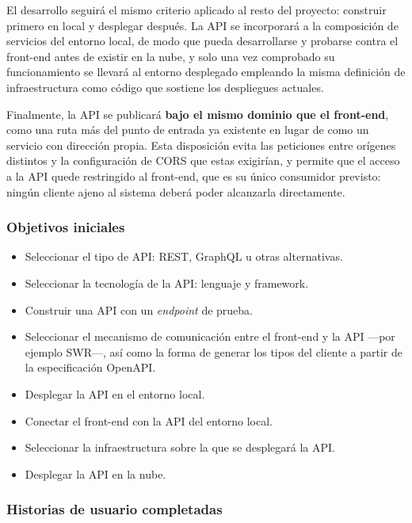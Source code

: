 El desarrollo seguirá el mismo criterio aplicado al resto del proyecto:
construir primero en local y desplegar después. La API se incorporará a la
composición de servicios del entorno local, de modo que pueda desarrollarse y
probarse contra el front-end antes de existir en la nube, y solo una vez
comprobado su funcionamiento se llevará al entorno desplegado empleando la
misma definición de infraestructura como código que sostiene los despliegues
actuales.

Finalmente, la API se publicará \textbf{bajo el mismo dominio que el
	front-end}, como una ruta más del punto de entrada ya existente en lugar de
como un servicio con dirección propia. Esta disposición evita las peticiones
entre orígenes distintos y la configuración de CORS que estas exigirían, y
permite que el acceso a la API quede restringido al front-end, que es su único
consumidor previsto: ningún cliente ajeno al sistema deberá poder alcanzarla
directamente.

\subsubsection*{Objetivos iniciales}

\begin{itemize}
	\item Seleccionar el tipo de API: REST, GraphQL u otras alternativas.
	\item Seleccionar la tecnología de la API: lenguaje y framework.
	\item Construir una API con un \textit{endpoint} de prueba.
	\item Seleccionar el mecanismo de comunicación entre el front-end y la API
	      —por ejemplo SWR—, así como la forma de generar los tipos del cliente a
	      partir de la especificación OpenAPI.
	\item Desplegar la API en el entorno local.
	\item Conectar el front-end con la API del entorno local.
	\item Seleccionar la infraestructura sobre la que se desplegará la API.
	\item Desplegar la API en la nube.
\end{itemize}

\subsubsection*{Historias de usuario completadas}


